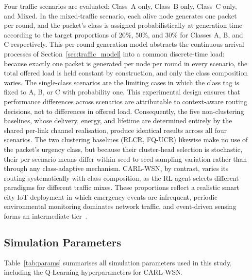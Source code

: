 \documentclass[12pt]{article}
\begin{document}
Four traffic scenarios are evaluated: Class~A only, Class~B only,
Class~C only, and Mixed. In the mixed-traffic scenario, each alive node
generates one packet per round, and the packet's class is assigned
probabilistically at generation time according to the target proportions
of 20\%, 50\%, and 30\% for Classes A, B, and C respectively. This
per-round generation model abstracts the continuous arrival processes of
Section~\ref{sec:traffic_model} into a common discrete-time load: because
exactly one packet is generated per node per round in every scenario, the
total offered load is held constant by construction, and only the class
composition varies. The single-class scenarios are the limiting cases in
which the class tag is fixed to A, B, or C with probability one. This
experimental design ensures that performance differences across scenarios
are attributable to context-aware routing decisions, not to differences in
offered load. Consequently, the five non-clustering baselines, whose
delivery, energy, and lifetime are determined entirely by the shared
per-link channel realisation, produce identical results across all four
scenarios. The two clustering baselines (RLCR, FQ-UCR) likewise make no use
of the packet's urgency class, but because their cluster-head selection is
stochastic, their per-scenario means differ within seed-to-seed sampling
variation rather than through any class-adaptive mechanism. CARL-WSN, by
contrast, varies its routing systematically with class composition, as the
RL agent selects different paradigms for different traffic mixes. These
proportions reflect a realistic smart city IoT deployment in which emergency
events are infrequent, periodic environmental monitoring dominates network
traffic, and event-driven sensing forms an intermediate
tier~\cite{el-fouly_environment-aware_2023,zohrabi2024}.

\subsection{Simulation Parameters}

Table~\ref{tab:params} summarises all simulation parameters used in
this study, including the Q-Learning hyperparameters for CARL-WSN.
\end{document}
